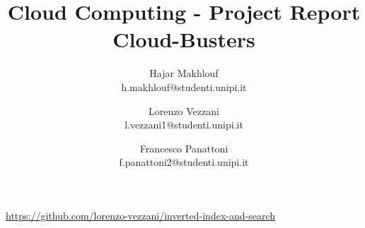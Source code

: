 \documentclass{article}
\title{Cloud Computing - Project Report \\ Cloud-Busters}
\author{
    Hajar Makhlouf  \\ h.makhlouf@studenti.unipi.it \and 
    Lorenzo Vezzani \\ l.vezzani1@studenti.unipi.it \and
    Francesco Panattoni \\ f.panattoni2@studenti.unipi.it}
\begin{document}
	
	\maketitle
	
	\begin{center}
		\scriptsize
		\href{https://github.com/lorenzo-vezzani/inverted-index-and-search}{https://github.com/lorenzo-vezzani/inverted-index-and-search}
	\end{center}

	
	
	\begin{multicols}{2}
	
	
	
	
	
	
	
	
	\end{multicols}
	
\end{document}
